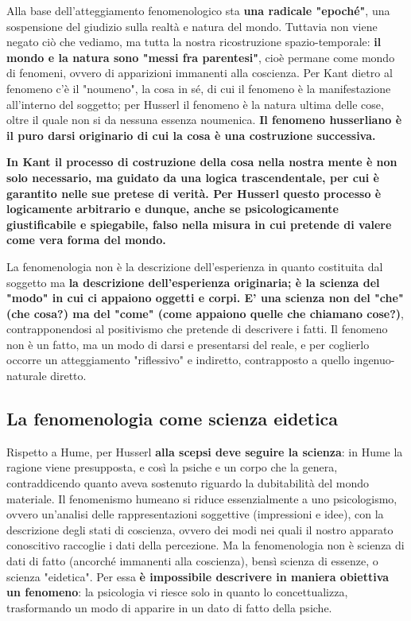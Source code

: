 Alla base dell'atteggiamento fenomenologico
sta \textbf{una radicale "epoché"}, una sospensione del
giudizio sulla realtà e natura del mondo.
Tuttavia non viene negato ciò che vediamo, ma
tutta la nostra ricostruzione spazio-temporale:
\textbf{il mondo e la natura sono "messi fra parentesi"},
cioè permane come mondo di fenomeni, ovvero
di apparizioni immanenti alla coscienza.
Per Kant dietro al fenomeno c'è il "noumeno", la cosa
in sé, di cui il fenomeno è la manifestazione
all'interno del soggetto; per Husserl il fenomeno è la natura ultima delle cose, oltre il
quale non si da nessuna essenza noumenica.
\textbf{Il fenomeno husserliano è il puro darsi originario
di cui la cosa è una costruzione successiva.}

\textbf{In Kant il processo di costruzione della cosa
nella nostra mente è non solo necessario, ma
guidato da una logica trascendentale, per cui
è garantito nelle sue pretese di verità. Per
Husserl questo processo è logicamente
arbitrario e dunque, anche se psicologicamente
giustificabile e spiegabile, falso nella misura
in cui pretende di valere come vera forma
del mondo.}

La fenomenologia non è la descrizione dell'esperienza in quanto costituita dal soggetto
ma \textbf{la descrizione dell'esperienza originaria;
è la scienza del "modo" in cui ci appaiono
oggetti e corpi. E' una scienza non del "che"
(che cosa?) ma del "come" (come appaiono
quelle che chiamano cose?)}, contrapponendosi al
positivismo che pretende di descrivere i fatti.
Il fenomeno non è un fatto, ma un
modo di darsi e presentarsi del reale, e
per coglierlo occorre un atteggiamento
"riflessivo" e indiretto, contrapposto a
quello ingenuo-naturale diretto.

\subsection{La fenomenologia come scienza eidetica}

Rispetto a Hume, per Husserl \textbf{alla scepsi deve
seguire la scienza}: in Hume la ragione viene
presupposta, e così la psiche e un corpo che la
genera, contraddicendo quanto aveva sostenuto
riguardo la dubitabilità del mondo materiale.
Il fenomenismo humeano si riduce essenzialmente
a uno psicologismo, ovvero un'analisi delle
rappresentazioni soggettive (impressioni e idee),
con la descrizione degli stati di coscienza,
ovvero dei modi nei quali il nostro apparato
conoscitivo raccoglie i dati della percezione.
Ma la fenomenologia non è scienza di dati
di fatto (ancorché immanenti alla coscienza),
bensì scienza di essenze, o scienza "eidetica".
Per essa \textbf{è impossibile descrivere in maniera obiettiva
un fenomeno}: la psicologia vi riesce solo in quanto
lo concettualizza, trasformando un modo di
apparire in un dato di fatto della psiche.

